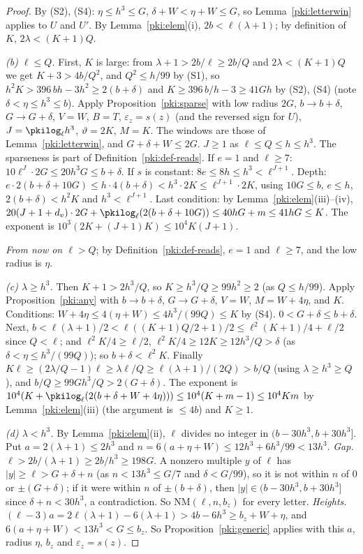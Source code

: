 \documentclass[10pt]{amsart}
\theoremstyle{definition}
\theoremstyle{remark}
\begin{document}
\begin{proof}
By (S2), (S4): $\eta\le h^3\le G$, $\delta+W<\eta+W\le G$, so Lemma~\ref{pki:letterwin} applies
to $U$ and $U'$. By Lemma~\ref{pki:elem}(i), $2b<\ell(\lambda+1)$; by definition of $K$,
$2\lambda<(K+1)Q$.

\emph{(b) $\ell\le Q$.} First, $K$ is large: from $\lambda+1>2b/\ell\ge2b/Q$ and
$2\lambda<(K+1)Q$ we get $K+3>4b/Q^2$, and $Q^2\le h/99$ by (S1), so
$h^2K>396\,bh-3h^2\ge 2(b+\delta)$ and $K\ge 396\,b/h-3\ge41Gh$ by (S2), (S4) (note $\delta<\eta\le
h^3\le b$). Apply Proposition~\ref{pki:sparse} with low radius $2G$, $b\to b+\delta$, $G\to G+\delta$,
$V=W$, $B=T$, $\varepsilon_z=s(z)$ (and the reversed sign for $U$), $J=\pkilog_\ell h^3$,
$\vartheta=2K$, $M=K$. The windows are those of Lemma~\ref{pki:letterwin}, and $G+\delta+W\le2G$.
$J\ge1$ as $\ell\le Q\le h\le h^3$. The sparseness is part of Definition~\ref{pki:def-reads}. If
$e=1$ and $\ell\ge7$: $10\ell^J\cdot2G\le20h^3G\le b+\delta$. If $s$ is constant:
$8e\le8h\le h^3<\ell^{J+1}$. Depth: $e\cdot2(b+\delta+10G)\le h\cdot4(b+\delta)<h^3\cdot2K\le
\ell^{J+1}\cdot2K$, using $10G\le b$, $e\le h$, $2(b+\delta)<h^2K$ and $h^3<\ell^{J+1}$. Last
condition: by Lemma~\ref{pki:elem}(iii)--(iv), $20(J+1+d_v)\cdot2G+\pkilog_\ell(2(b+\delta+10G))\le
40hG+m\le41hG\le K$. The exponent is $10^3(2K+(J+1)K)\le10^4K(J+1)$.

\emph{From now on $\ell>Q$}; by Definition~\ref{pki:def-reads}, $e=1$ and $\ell\ge7$, and the low
radius is $\eta$.

\emph{(c) $\lambda\ge h^3$.} Then $K+1>2h^3/Q$, so $K\ge h^3/Q\ge99h^2\ge2$ (as $Q\le h/99$).
Apply Proposition~\ref{pki:any} with $b\to b+\delta$, $G\to G+\delta$, $V=W$, $M=W+4\eta$, and $K$.
Conditions: $W+4\eta\le4(\eta+W)\le4h^3/(99Q)\le K$ by (S4). $0<G+\delta\le b+\delta$. Next,
$b<\ell(\lambda+1)/2<\ell((K+1)Q/2+1)/2\le\ell^2(K+1)/4+\ell/2$ since $Q<\ell$; and
$\ell^2K/4\ge\ell/2$, $\ell^2K/4\ge 12K\ge12h^3/Q>\delta$ (as $\delta<\eta\le h^3/(99Q)$); so
$b+\delta<\ell^2K$. Finally $K\ell\ge(2\lambda/Q-1)\ell\ge\lambda\ell/Q\ge\ell(\lambda+1)/(2Q)>b/Q$
(using $\lambda\ge h^3\ge Q$), and $b/Q\ge99Gh^3/Q>2(G+\delta)$. The exponent is
$10^4(K+\pkilog_\ell(2(b+\delta+W+4\eta)))\le10^4(K+m-1)\le10^4Km$ by Lemma~\ref{pki:elem}(iii)
(the argument is $\le4b$) and $K\ge1$.

\emph{(d) $\lambda<h^3$.} By Lemma~\ref{pki:elem}(ii), $\ell$ divides no integer in
$(b-30h^3,b+30h^3]$. Put $a=2(\lambda+1)\le2h^3$ and $n=6(a+\eta+W)\le12h^3+6h^3/99<13h^3$.
\emph{Gap.} $\ell>2b/(\lambda+1)\ge2b/h^3\ge198G$. A nonzero multiple $y$ of $\ell$ has $|y|\ge\ell>
G+\delta+n$ (as $n<13h^3\le G/7$ and $\delta<G/99$), so it is not within $n$ of $0$ or
$\pm(G+\delta)$; if it were within $n$ of $\pm(b+\delta)$, then $|y|\in(b-30h^3,b+30h^3]$ since
$\delta+n<30h^3$, a contradiction. So $\mathrm{NM}(\ell,n,b_z)$ for every letter. \emph{Heights.}
$(\ell-3)a=2\ell(\lambda+1)-6(\lambda+1)>4b-6h^3\ge b_z+W+\eta$, and $6(a+\eta+W)<13h^3<G\le b_z$.
So Proposition~\ref{pki:generic} applies with this $a$, radius $\eta$, $b_z$ and
$\varepsilon_z=s(z)$.


\end{proof}
\end{document}
